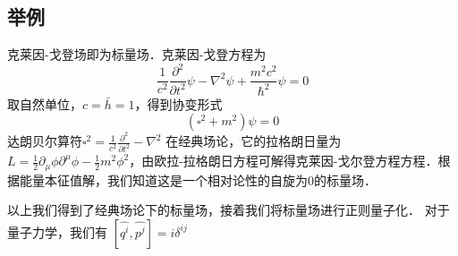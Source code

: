 \subsection{举例}
克莱因-戈登场即为标量场．克莱因-戈登方程为
\begin{equation}
\frac{1}{c^{2}} \frac{\partial^{2}}{\partial t^{2}} \psi-\nabla^{2} \psi+\frac{m^{2} c^{2}}{\hbar^{2}} \psi=0
\end{equation}
取自然单位，$c=\bar{h}=1$，得到协变形式
\begin{equation}
\left(\square^{2}+m^{2}\right) \psi=0
\end{equation}
达朗贝尔算符$\square^{2}=\frac{1}{c^{2}} \frac{\partial^{2}}{\partial t^{2}}-\nabla^{2}$
在经典场论，它的拉格朗日量为$L=\frac{1}{2} \partial_{\mu} \phi \partial^{\mu} \phi-\frac{1}{2} m^{2} \phi^{2}$，由欧拉-拉格朗日方程可解得克莱因-戈尔登方程方程．根据能量本征值解，我们知道这是一个相对论性的自旋为0的标量场．
\begin{corollary}{}
以上我们得到了经典场论下的标量场，接着我们将标量场进行正则量子化．
对于量子力学，我们有
$\left[\hat{q^{i}}, \hat{p^{j}}\right]=i \delta^{i j}$
\end{corollary}